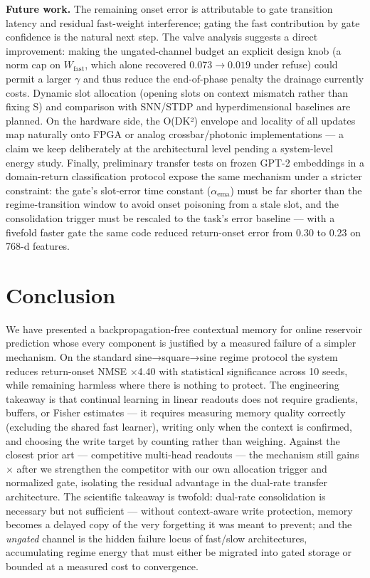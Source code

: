 \documentclass[11pt]{article}
\begin{document}
\textbf{Future work.} The remaining onset error is attributable to gate
transition latency and residual fast-weight interference; gating the
fast contribution by gate confidence is the natural next step. The
valve analysis suggests a direct improvement: making the
ungated-channel budget an explicit design knob (a norm cap on
\(W_{\mathrm{fast}}\), which alone recovered 0.073\(\to0.019\) under
refuse) could permit a larger \(\gamma\) and thus reduce the
end-of-phase penalty the drainage currently costs.
Dynamic slot allocation (opening slots on context mismatch rather
than fixing S) and comparison with SNN/STDP and hyperdimensional
baselines are planned. On the hardware side, the O(DK²) envelope and
locality of all updates map naturally onto FPGA or analog
crossbar/photonic implementations --- a claim we keep deliberately at
the architectural level pending a system-level energy study.
Finally, preliminary transfer tests on frozen GPT-2 embeddings in a
domain-return classification protocol expose the same mechanism under
a stricter constraint: the gate's slot-error time constant
(\(\alpha_{\mathrm{ema}}\)) must be far shorter than the
regime-transition window to avoid onset poisoning from a stale slot,
and the consolidation trigger must be rescaled to the task's error
baseline --- with a fivefold faster gate the same code reduced
return-onset error from 0.30 to 0.23 on 768-d features.

\section{Conclusion}\label{conclusion}

We have presented a backpropagation-free contextual memory for
online reservoir prediction whose every component is justified by a
measured failure of a simpler mechanism. On the standard
sine→square→sine regime protocol the system reduces return-onset
NMSE ×4.40 with statistical significance across 10 seeds, while
remaining harmless where there is nothing to protect. The
engineering takeaway is that continual learning in linear readouts
does not require gradients, buffers, or Fisher estimates --- it
requires measuring memory quality correctly (excluding the shared
fast learner), writing only when the context is confirmed, and
choosing the write target by counting rather than weighing. Against
the closest prior art --- competitive multi-head readouts --- the
mechanism still gains \(\times\)\residualRatio{} after we strengthen the competitor with
our own allocation trigger and normalized gate, isolating the
residual advantage in the dual-rate transfer architecture. The
scientific takeaway is twofold: dual-rate consolidation is necessary
but not sufficient --- without context-aware write protection, memory
becomes a delayed copy of the very forgetting it was meant to
prevent; and the \emph{ungated} channel is the hidden failure locus of
fast/slow architectures, accumulating regime energy that must either
be migrated into gated storage or bounded at a measured cost to
convergence.
\end{document}

